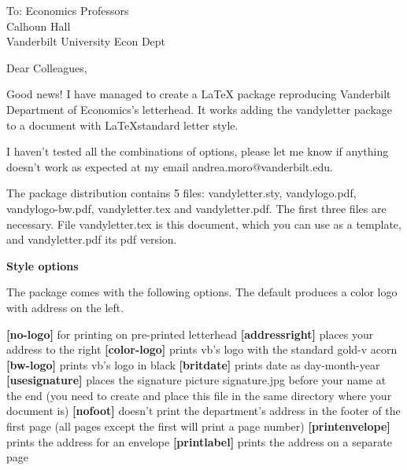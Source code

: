 \documentclass[color-logo]{letter}
\begin{document}
\begin{letter}{
To: Economics Professors\\
Calhoun Hall \\
Vanderbilt University Econ Dept}

\opening{
Dear Colleagues,
}


Good news! I have managed to create a LaTeX package reproducing Vanderbilt
Department of Economics's letterhead. It works adding the vandyletter package to a 
document with \LaTeX standard
letter style.

I haven't tested all the combinations of options, please let me know if anything doesn't
work as expected at my email andrea.moro@vanderbilt.edu. 

The package distribution contains 5
files: vandyletter.sty, vandylogo.pdf, vandylogo-bw.pdf, vandyletter.tex and
vandyletter.pdf. The first three files are necessary. File vandyletter.tex
is this document, which you can use as a template, and vandyletter.pdf its
pdf version. \bigskip

\textbf{Style options}

The package comes with the following options. The default produces a color logo with address on the left.

\textbf{[no-logo]} for printing on pre-printed letterhead\vspace{.8ex} \newline 
\textbf{[addressright]} places your address to the right\vspace{.8ex} \newline 
\textbf{[color-logo]} prints vb's logo with the standard gold-v acorn \vspace{.8ex} \newline 
\textbf{[bw-logo]} prints vb's logo in black\vspace{.8ex} \newline 
\textbf{[britdate]} prints date as day-month-year\vspace{.8ex} \newline 
\textbf{[usesignature]} places the signature picture signature.jpg before your name
at the end (you need to create and place this file in the same directory
where your document is)\vspace{.8ex} \newline 
\textbf{[nofoot]} doesn't print the department's address in the footer of the first
page (all pages except the first will print a page number) \vspace{.8ex} \newline 
\textbf{[printenvelope]}
prints the address for an envelope \vspace{.8ex} \newline 
\textbf{[printlabel]} prints the address on a separate page \vspace{.8ex} \newline 



\end{letter}
\end{document}
